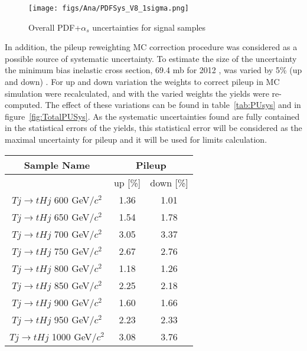 \begin{figure}[!Hhtbp]
  \begin{center}
    \texttt{[image: figs/Ana/PDFSys\_V8\_1sigma.png]}
    \caption{Overall PDF+$\alpha_{s}$ uncertainties for signal samples}
    \label{fig:TotalPDFSys}
  \end{center}
\end{figure}

In addition, the pileup reweighting MC correction procedure was considered as a possible source of systematic uncertainty. To estimate the size of the uncertainty the minimum bias inelastic cross section, 69.4 mb for 2012 , was varied by 5\% (up and down) . For up and down variation the weights to correct pileup in MC simulation were recalculated, and with the varied weights the yields were re-computed. The effect of these variations can be found in table~\ref{tab:PUsys} and in figure~\ref{fig:TotalPUSys}. As the systematic uncertainties found are fully contained in the statistical errors of the yields, this statistical error will be considered as the maximal uncertainty for pileup and it will be used for limits calculation. %

\begin{table*}[htbH]
\begin{center}
\begin{tabular}{|c|c|c|}
\hline 
Sample Name & \multicolumn{2}{c|}{Pileup} \\
\hline
 & up [\%] & down [\%] \\
\hline
$Tj\rightarrow tHj$ 600 GeV/$c^{2}$ & 1.36 & 1.01 \\
$Tj\rightarrow tHj$ 650 GeV/$c^{2}$ & 1.54 & 1.78 \\
$Tj\rightarrow tHj$ 700 GeV/$c^{2}$ & 3.05 & 3.37 \\
$Tj\rightarrow tHj$ 750 GeV/$c^{2}$ & 2.67 & 2.76 \\
$Tj\rightarrow tHj$ 800 GeV/$c^{2}$ & 1.18 & 1.26 \\
$Tj\rightarrow tHj$ 850 GeV/$c^{2}$ & 2.25 & 2.18 \\
$Tj\rightarrow tHj$ 900 GeV/$c^{2}$ & 1.60 & 1.66 \\
$Tj\rightarrow tHj$ 950 GeV/$c^{2}$ & 2.23 & 2.33 \\
$Tj\rightarrow tHj$ 1000 GeV/$c^{2}$ & 3.08 & 3.76 \\
\hline
\end{tabular}
\caption{Pileup uncertainties for signal samples\label{tab:PUsys}}
\end{center}
\end{table*}

